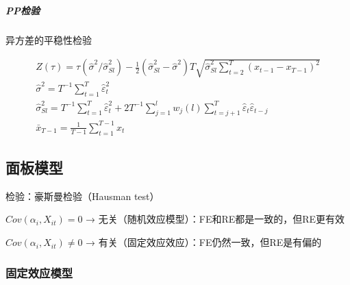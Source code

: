 \documentclass[12pt]{book}
\begin{document}
\subparagraph{PP检验}

异方差的平稳性检验

\begin{gather*}
    Z\left(\tau\right) =\tau(\hat{\sigma}^2/\hat{\sigma}_{Sl}^2 ) -\frac{1}{2}  (\hat{\sigma}_{Sl}^2-\hat{\sigma}^2) T \sqrt{\hat{\sigma}_{Sl}^2 \sum_{t=2}^{T}{(x_{t-1}-x_{T-1})^2}} \\
    {\hat{\sigma}}^2=T^{-1}\sum_{t=1}^{T}{\hat{\varepsilon}}_t^2\\
    {\hat{\sigma}}_{Sl}^2=T^{-1}\sum_{t=1}^{T}{\hat{\varepsilon}}_t^2+2T^{-1}\sum_{j=1}^{l}{w_j(l)\sum_{t=j+1}^{T}{{\hat{\varepsilon}}_t{\hat{\varepsilon}}_{t-j}}}\\
    \bar{x}_{T-1}=\frac{1}{T-1}\sum_{t=1}^{T-1}{x_t}
\end{gather*}












\subsection{面板模型}



\par 检验：豪斯曼检验（Hausman test）
\par $Cov(\alpha_i,X_{it})=0$ → 无关（随机效应模型）：FE和RE都是一致的，但RE更有效
\par $Cov(\alpha_i,X_{it})\neq 0 $ → 有关（固定效应效应）：FE仍然一致，但RE是有偏的



\subsubsection{固定效应模型}
\end{document}
